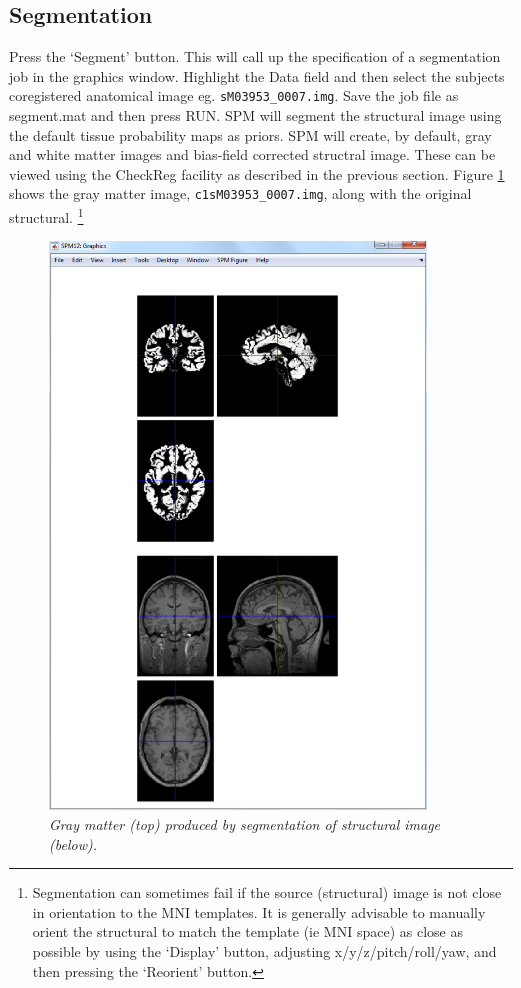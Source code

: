 \documentclass[a4paper,titlepage]{book}
\begin{document}
\subsection{Segmentation}

Press the `Segment' button. This will call up the specification of a segmentation job in the graphics 
window. Highlight the Data field and then select 
the subjects coregistered anatomical image 
eg. \verb!sM03953_0007.img!. Save the job file
as {\sf segment.mat} and then press RUN.
SPM will segment the structural image using 
the default tissue probability maps as 
priors. 
SPM will create, by default, gray and white matter
images and bias-field corrected structral image.
These can be viewed using the CheckReg facility 
as described in the previous section. Figure \ref{face_gray} shows the gray matter image, \verb!c1sM03953_0007.img!, along with the original structural. \footnote{Segmentation can sometimes fail if the source (structural) image is not close in orientation to the MNI templates. It is generally advisable to manually orient the structural to match the template (ie MNI space) as close as possible by using the `Display' button, adjusting x/y/z/pitch/roll/yaw, and then pressing the `Reorient' button.}

\begin{figure}
\begin{center}
\includegraphics[width=100mm]{faces/gray}
\caption{\em Gray matter (top) produced by segmentation of structural image (below). \label{face_gray}}
\end{center}
\end{figure}
\end{document}
